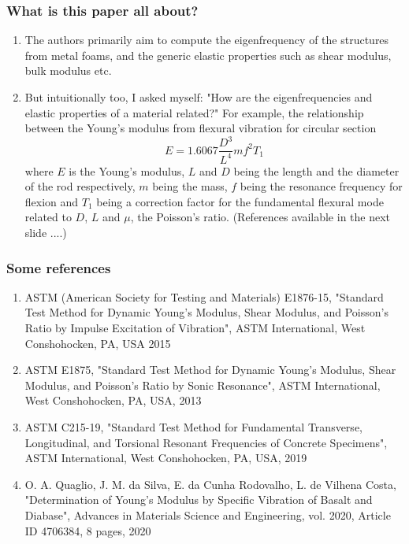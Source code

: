 \documentclass{beamer}
\begin{document}
\begin{frame}
\frametitle{What is this paper all about?}
\begin{enumerate}
	\item The authors primarily aim to compute the eigenfrequency of the structures from metal foams, and the generic elastic properties such as shear modulus, bulk modulus etc.
	\item But intuitionally too, I asked myself: "How are the eigenfrequencies and elastic properties of a material related?"
	For example, the relationship between the Young's modulus from flexural vibration for circular section
	\begin{equation}
		E = 1.6067 \frac{D^3}{L^4} m f^2 T_1
	\end{equation}
	where $E$ is the Young's modulus, $L$ and $D$ being the length and the diameter of the rod respectively, $m$ being the mass, $f$ being the resonance frequency for flexion and $T_1$ being a correction factor for the fundamental flexural mode related to $D$, $L$ and $\mu$, the Poisson's ratio. (References available in the next slide ....)
\end{enumerate}
\end{frame}

\begin{frame}
\frametitle{Some references}
\begin{enumerate}
	\item ASTM (American Society for Testing and Materials) E1876-15, "Standard Test Method for Dynamic Young's Modulus, Shear Modulus, and Poisson's Ratio by Impulse Excitation of Vibration", ASTM International, West Conshohocken, PA, USA 2015
	\item ASTM E1875, "Standard Test Method for Dynamic Young’s Modulus, Shear Modulus, and Poisson’s Ratio by Sonic Resonance", ASTM International, West Conshohocken, PA, USA, 2013
	\item ASTM C215-19, "Standard Test Method for Fundamental Transverse, Longitudinal, and Torsional Resonant Frequencies of Concrete Specimens", ASTM International, West Conshohocken, PA, USA, 2019
	\item O. A. Quaglio, J. M. da Silva, E. da Cunha Rodovalho, L. de Vilhena Costa, "Determination of Young's Modulus by Specific Vibration of Basalt and Diabase", Advances in Materials Science and Engineering, vol. 2020, Article ID 4706384, 8 pages, 2020
\end{enumerate}
\end{frame}
\end{document}
